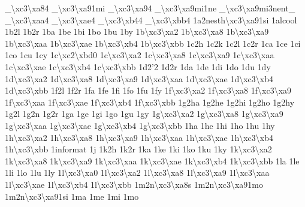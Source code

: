 {\-\_\-\textbackslash{}xc3\textbackslash{}xa84 \-\_\-\textbackslash{}xc3\textbackslash{}xa91mi \-\_\-\textbackslash{}xc3\textbackslash{}xa94 \-\_\-\textbackslash{}xc3\textbackslash{}xa9mi1ne \-\_\-\textbackslash{}xc3\textbackslash{}xa9mi3nent\-\_\- \-\_\-\textbackslash{}xc3\textbackslash{}xaa4 \-\_\-\textbackslash{}xc3\textbackslash{}xae4 \-\_\-\textbackslash{}xc3\textbackslash{}xb44 \-\_\-\textbackslash{}xc3\textbackslash{}xbb4 1a2nesth\textbackslash{}xc3\textbackslash{}xa91si 1alcool 1b2l 1b2r 1ba 1be 1bi 1bo 1bu 1by 1b\textbackslash{}xc3\textbackslash{}xa2 1b\textbackslash{}xc3\textbackslash{}xa8 1b\textbackslash{}xc3\textbackslash{}xa9 1b\textbackslash{}xc3\textbackslash{}xaa 1b\textbackslash{}xc3\textbackslash{}xae 1b\textbackslash{}xc3\textbackslash{}xb4 1b\textbackslash{}xc3\textbackslash{}xbb 1c2h 1c2k 1c2l 1c2r 1ca 1ce 1ci 1co 1cu 1cy 1c\textbackslash{}xc2\textbackslash{}xbd0 1c\textbackslash{}xc3\textbackslash{}xa2 1c\textbackslash{}xc3\textbackslash{}xa8 1c\textbackslash{}xc3\textbackslash{}xa9 1c\textbackslash{}xc3\textbackslash{}xaa 1c\textbackslash{}xc3\textbackslash{}xae 1c\textbackslash{}xc3\textbackslash{}xb4 1c\textbackslash{}xc3\textbackslash{}xbb 1d2'2 1d2r 1da 1de 1di 1do 1du 1dy 1d\textbackslash{}xc3\textbackslash{}xa2 1d\textbackslash{}xc3\textbackslash{}xa8 1d\textbackslash{}xc3\textbackslash{}xa9 1d\textbackslash{}xc3\textbackslash{}xaa 1d\textbackslash{}xc3\textbackslash{}xae 1d\textbackslash{}xc3\textbackslash{}xb4 1d\textbackslash{}xc3\textbackslash{}xbb 1f2l 1f2r 1fa 1fe 1fi 1fo 1fu 1fy 1f\textbackslash{}xc3\textbackslash{}xa2 1f\textbackslash{}xc3\textbackslash{}xa8 1f\textbackslash{}xc3\textbackslash{}xa9 1f\textbackslash{}xc3\textbackslash{}xaa 1f\textbackslash{}xc3\textbackslash{}xae 1f\textbackslash{}xc3\textbackslash{}xb4 1f\textbackslash{}xc3\textbackslash{}xbb 1g2ha 1g2he 1g2hi 1g2ho 1g2hy 1g2l 1g2n 1g2r 1ga 1ge 1gi 1go 1gu 1gy 1g\textbackslash{}xc3\textbackslash{}xa2 1g\textbackslash{}xc3\textbackslash{}xa8 1g\textbackslash{}xc3\textbackslash{}xa9 1g\textbackslash{}xc3\textbackslash{}xaa 1g\textbackslash{}xc3\textbackslash{}xae 1g\textbackslash{}xc3\textbackslash{}xb4 1g\textbackslash{}xc3\textbackslash{}xbb 1ha 1he 1hi 1ho 1hu 1hy 1h\textbackslash{}xc3\textbackslash{}xa2 1h\textbackslash{}xc3\textbackslash{}xa8 1h\textbackslash{}xc3\textbackslash{}xa9 1h\textbackslash{}xc3\textbackslash{}xaa 1h\textbackslash{}xc3\textbackslash{}xae 1h\textbackslash{}xc3\textbackslash{}xb4 1h\textbackslash{}xc3\textbackslash{}xbb 1informat 1j 1k2h 1k2r 1ka 1ke 1ki 1ko 1ku 1ky 1k\textbackslash{}xc3\textbackslash{}xa2 1k\textbackslash{}xc3\textbackslash{}xa8 1k\textbackslash{}xc3\textbackslash{}xa9 1k\textbackslash{}xc3\textbackslash{}xaa 1k\textbackslash{}xc3\textbackslash{}xae 1k\textbackslash{}xc3\textbackslash{}xb4 1k\textbackslash{}xc3\textbackslash{}xbb 1la 1le 1li 1lo 1lu 1ly 1l\textbackslash{}xc3\textbackslash{}xa0 1l\textbackslash{}xc3\textbackslash{}xa2 1l\textbackslash{}xc3\textbackslash{}xa8 1l\textbackslash{}xc3\textbackslash{}xa9 1l\textbackslash{}xc3\textbackslash{}xaa 1l\textbackslash{}xc3\textbackslash{}xae 1l\textbackslash{}xc3\textbackslash{}xb4 1l\textbackslash{}xc3\textbackslash{}xbb 1m2n\textbackslash{}xc3\textbackslash{}xa8s 1m2n\textbackslash{}xc3\textbackslash{}xa91mo 1m2n\textbackslash{}xc3\textbackslash{}xa91si 1ma 1me 1mi 1mo }
